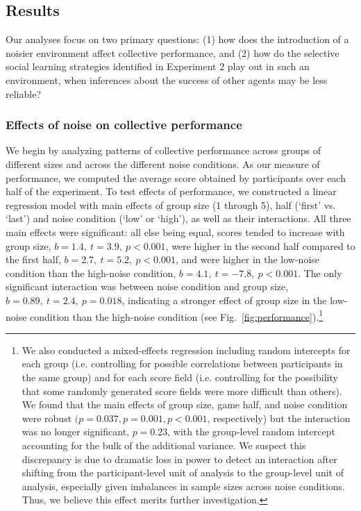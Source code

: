 \documentclass[12pt,letterpaper]{article}
\begin{document}
\subsection{Results}

Our analyses focus on two primary questions: (1) how does the introduction of a noisier environment affect collective performance, and (2) how do the selective social learning strategies identified in Experiment 2 play out in such an environment, when inferences about the success of other agents may be less reliable?

\subsubsection{Effects of noise on collective performance}

We begin by analyzing patterns of collective performance across groups of different sizes and across the different noise conditions.
As our measure of performance, we computed the average score obtained by participants over each half of the experiment.
To test effects of performance, we constructed a linear regression model with main effects of group size (1 through 5), half (`first' vs. `last')  and noise condition (`low' or `high'), as well as their interactions.
All three main effects were significant: all else being equal, scores tended to increase with group size, $b=1.4,~t=3.9,~p <0.001$, were higher in the second half compared to the first half, $b=2.7,~t=5.2,~p<0.001$, and were higher in the low-noise condition than the high-noise condition, $b=4.1,~t=-7.8,~p<0.001$.
The only significant interaction was between noise condition and group size, $b=0.89,~t=2.4,~p=0.018$, indicating a stronger effect of group size in the low-noise condition than the high-noise condition (see Fig.~\ref{fig:performance}).\footnote{We also conducted a mixed-effects regression including random intercepts for each group (i.e. controlling for possible correlations between participants in the same group) and for each score field (i.e. controlling for the possibility that some randomly generated score fields were more difficult than others). We found that the main effects of group size, game half, and noise condition were robust $(p=0.037,p=0.001,p<0.001$, respectively) but the interaction was no longer significant, $p=0.23$, with the group-level random intercept accounting for the bulk of the additional variance. We suspect this discrepancy is due to dramatic loss in power to detect an interaction after shifting from the participant-level unit of analysis to the group-level unit of analysis, especially given imbalances in sample sizes across noise conditions. Thus, we believe this effect merits further investigation.}
\end{document}
